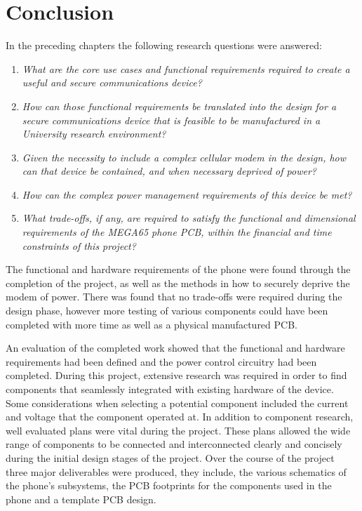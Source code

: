 
\chapter{Conclusion} %

\label{Chapter8} %

	In the preceding chapters the following research questions were answered: 
\begin{enumerate}
	\item \textit{What are the core use cases and functional requirements required to create a useful and secure communications device?}
	\item \textit{How can those functional requirements be translated into the design for a secure communications device that is feasible to be manufactured in a University research environment?}
	\item \textit{Given the necessity to include a complex cellular modem in the design, how can that device be contained, and when necessary deprived of power?}
	\item \textit{How can the complex power management requirements of this device be met?}
	\item \textit{What trade-offs, if any, are required to satisfy the functional and dimensional requirements of the MEGA65 phone PCB, within the financial and time constraints of this project?}
\end{enumerate}

	The functional and hardware requirements of the phone were found through the completion of the project, as well as the methods in how to securely deprive the modem of power. 
There was found that no trade-offs were required during the design phase, however more testing of various components could have been completed with more time as well as a physical manufactured PCB.

An evaluation of the completed work showed that the functional and hardware requirements had been defined and the power control circuitry had been completed. During this project, extensive research was required in order to find components that seamlessly integrated with existing hardware of the device. 
Some considerations when selecting a potential component included the current and voltage that the component operated at. 
In addition to component research, well evaluated plans were vital during the project. 
These plans allowed the wide range of components to be connected and interconnected clearly and concisely during the initial design stages of the project. 
Over the course of the project three major deliverables were produced, they include, the various schematics of the phone's subsystems, the PCB footprints for the components used in the phone and a template PCB design. 
	

